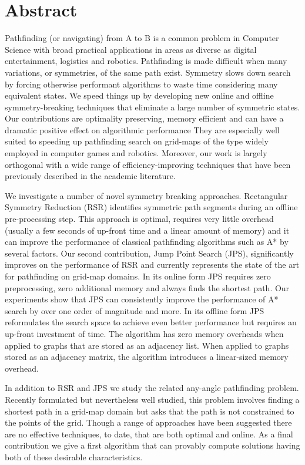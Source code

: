 \chapter*{Abstract}
\vspace{-1em}
Pathfinding (or navigating) from A to B is a common problem in Computer
Science with broad practical applications in areas as diverse as digital
entertainment, logistics and robotics. Pathfinding is made difficult when
many variations, or symmetries, of the same path exist.  Symmetry slows down
search by forcing otherwise performant algorithms to waste time considering
many equivalent states.  We speed things up by developing new online and
offline symmetry-breaking techniques that eliminate a large number of
symmetric states.  Our contributions are optimality preserving, memory
efficient and can have a dramatic positive effect on algorithmic performance 
They are especially well suited to speeding up pathfinding search on grid-maps 
of the type widely employed in computer games and robotics.
Moreover, our work is largely orthogonal with a wide range of
efficiency-improving techniques that have been previously described in the
academic literature.
\par 
We investigate a number of novel symmetry breaking approaches.
Rectangular Symmetry Reduction (RSR) identifies symmetric path segments during an 
offline pre-processing step.
This approach is optimal, requires very little overhead (usually a few seconds of
up-front time and a linear amount of memory) and it can improve
the performance of classical pathfinding algorithms such as A{*} by several factors.
Our second contribution, Jump Point
Search (JPS), significantly improves on the performance of RSR and currently 
represents the state of the art for pathfinding on grid-map domains.
In its online form JPS requires zero preprocessing, zero additional memory and
always finds the shortest path. Our experiments show that JPS can consistently
improve the performance of A{*} search by over one order of magnitude and more.
In its offline form JPS reformulates the search space to achieve even better
performance but requires an up-front investment of time. The algorithm has
zero memory overheads when applied to graphs that are stored as an adjacency list.
When applied to graphs stored as an adjacency matrix, the algorithm introduces
a linear-sized memory overhead. 
\par
In addition to RSR and JPS we study the related any-angle pathfinding problem.
Recently formulated but nevertheless well studied, this problem involves
finding a shortest path in a grid-map domain but asks that the path is not
constrained to the points of the grid.  Though a range of approaches have been
suggested there are no effective techniques, to date, that are both optimal
and online.  As a final contribution we give a first algorithm that can
provably compute solutions having both of these desirable characteristics.

